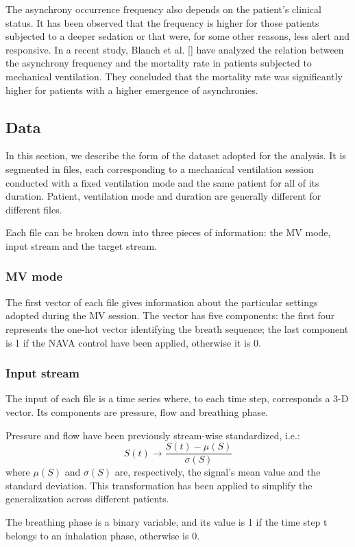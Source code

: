 \documentclass[a4paper, twoside]{article}
\begin{document}
    The asynchrony occurrence frequency also depends on the patient's clinical status. It has been observed that the frequency is higher for those patients subjected to a deeper sedation or that were, for some other reasons, less alert and responsive. In a recent study, Blanch et al. [] have analyzed the relation between the asynchrony frequency and the mortality rate in patients subjected to mechanical ventilation. They concluded that the mortality rate was significantly higher for patients with a higher emergence of asynchronies.


    \subsection{Data}
    In this section, we describe the form of the dataset adopted for the analysis. It is segmented in files, each corresponding to a mechanical ventilation session conducted with a fixed ventilation mode and the same patient for all of its duration. Patient, ventilation mode and duration are generally different for different files.

    Each file can be broken down into three pieces of information: the MV mode, input stream and the target stream.

    \subsubsection{MV mode}
    The first vector of each file gives information about the particular settings adopted during the MV session. The vector has five components: the first four represents the one-hot vector identifying the breath sequence; the last component is 1 if the NAVA control have been applied, otherwise it is 0.

    \subsubsection{Input stream}
    The input of each file is a time series where, to each time step, corresponds a 3-D vector. Its components are pressure, flow and breathing phase.

    Pressure and flow have been previously stream-wise standardized, i.e.:
    $$ S(t) \rightarrow \frac{S(t) - \mu(S)}{\sigma(S)} $$
    where $\mu(S)$ and $\sigma(S)$ are, respectively, the signal's mean value and the standard deviation. This transformation has been applied to simplify the generalization across different patients.

    The breathing phase is a binary variable, and its value is 1 if the time step t belongs to an inhalation phase, otherwise is 0.
\end{document}
